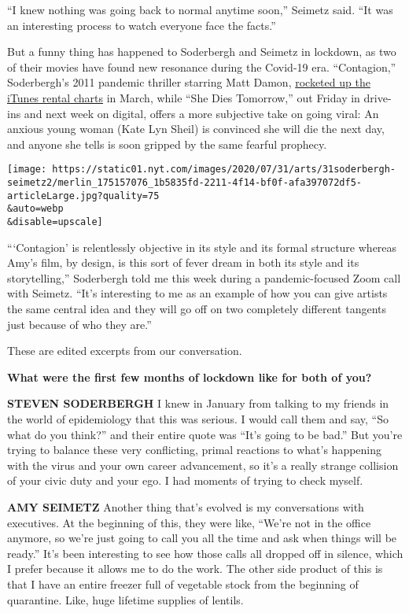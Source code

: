 ``I knew nothing was going back to normal anytime soon,'' Seimetz said.
``It was an interesting process to watch everyone face the facts.''

But a funny thing has happened to Soderbergh and Seimetz in lockdown, as
two of their movies have found new resonance during the Covid-19 era.
``Contagion,'' Soderbergh's 2011 pandemic thriller starring Matt Damon,
\href{https://www.nytimes.com/2020/03/04/business/media/coronavirus-contagion-movie.html}{rocketed
up the iTunes rental charts} in March, while ``She Dies Tomorrow,'' out
Friday in drive-ins and next week on digital, offers a more subjective
take on going viral: An anxious young woman (Kate Lyn Sheil) is
convinced she will die the next day, and anyone she tells is soon
gripped by the same fearful prophecy.

\texttt{[image: https://static01.nyt.com/images/2020/07/31/arts/31soderbergh-seimetz2/merlin\_175157076\_1b5835fd-2211-4f14-bf0f-afa397072df5-articleLarge.jpg?quality=75\\\&auto=webp\\\&disable=upscale]}

```Contagion' is relentlessly objective in its style and its formal
structure whereas Amy's film, by design, is this sort of fever dream in
both its style and its storytelling,'' Soderbergh told me this week
during a pandemic-focused Zoom call with Seimetz. ``It's interesting to
me as an example of how you can give artists the same central idea and
they will go off on two completely different tangents just because of
who they are.''

These are edited excerpts from our conversation.

\textbf{What were the first few months of lockdown like for both of
you?}

\textbf{STEVEN SODERBERGH} I knew in January from talking to my friends
in the world of epidemiology that this was serious. I would call them
and say, ``So what do you think?'' and their entire quote was ``It's
going to be bad.'' But you're trying to balance these very conflicting,
primal reactions to what's happening with the virus and your own career
advancement, so it's a really strange collision of your civic duty and
your ego. I had moments of trying to check myself.

\textbf{AMY SEIMETZ} Another thing that's evolved is my conversations
with executives. At the beginning of this, they were like, ``We're not
in the office anymore, so we're just going to call you all the time and
ask when things will be ready.'' It's been interesting to see how those
calls all dropped off in silence, which I prefer because it allows me to
do the work. The other side product of this is that I have an entire
freezer full of vegetable stock from the beginning of quarantine. Like,
huge lifetime supplies of lentils.

